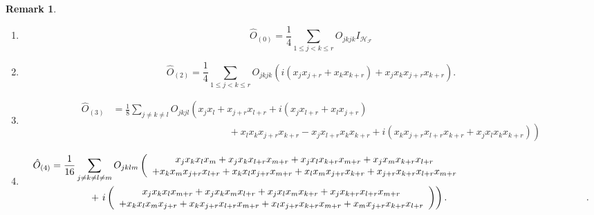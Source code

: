 \documentclass[aps,preprint]{revtex4}%
\newtheorem{remark}[theorem]{Remark}
\begin{document}
\begin{remark}
\begin{enumerate}
\item
\begin{equation}
\hat{O}_{\left(  0\right)  }=\frac{1}{4}\sum_{1\leq j<k\leq r}O_{jkjk}%
I_{\mathcal{H}_{\mathcal{F}}}%
\end{equation}


\item
\begin{equation}
\hat{O}_{\left(  2\right)  }=\frac{1}{4}\sum_{1\leq j<k\leq r}O_{jkjk}\left(
\overset{}{i\left(  x_{j}x_{j+r}+x_{k}x_{k+r}\right)  +x_{j}x_{k}%
x_{j+r}x_{k+r}}\right)  .
\end{equation}


\item
\begin{align}
\hat{O}_{\left(  3\right)  }  &  =\frac{1}{8}\sum_{j\neq k\neq l}%
O_{jkjl}\left(  \overset{}{x_{j}x_{l}+x_{j+r}x_{l+r}+i\left(  x_{j}%
x_{l+r}+x_{l}x_{j+r}\right)  }\right. \\
&  \hspace{2in}+\left.  \overset{}{x_{l}x_{k}x_{j+r}x_{k+r}-x_{j}x_{l+r}%
x_{k}x_{k+r}+i\left(  x_{k}x_{j+r}x_{l+r}x_{k+r}+x_{j}x_{l}x_{k}%
x_{k+r}\right)  }\right)
\end{align}


\item
\begin{align}
\hat{O}_{\left(  4\right)  }  &  =\frac{1}{16}\sum_{j\neq k\neq l\neq
m}O_{jklm}\left(
\begin{array}
[c]{c}%
\overset{}{x_{j}x_{k}x_{l}x_{m}+x_{j}x_{k}x_{l+r}x_{m+r}+x_{j}x_{l}%
x_{k+r}x_{m+r}+x_{j}x_{m}x_{k+r}x_{l+r}}\\
+\overset{}{x_{k}x_{m}x_{j+r}x_{l+r}+x_{k}x_{l}x_{j+r}x_{m+r}+x_{l}%
x_{m}x_{j+r}x_{k+r}+x_{j+r}x_{k+r}x_{l+r}x_{m+r}}%
\end{array}
\right. \\
&  \qquad\quad\quad+\left.  i\left(
\begin{array}
[c]{c}%
\overset{}{x_{j}x_{k}x_{l}x_{m+r}+x_{j}x_{k}x_{m}x_{l+r}+x_{j}x_{l}%
x_{m}x_{k+r}+x_{j}x_{k+r}x_{l+r}x_{m+r}}\\
+\overset{}{x_{k}x_{l}x_{m}x_{j+r}+x_{k}x_{j+r}x_{l+r}x_{m+r}+x_{l}%
x_{j+r}x_{k+r}x_{m+r}+x_{m}x_{j+r}x_{k+r}x_{l+r}}%
\end{array}
\right)  \right)  .\hspace{2in}.
\end{align}

\end{enumerate}
\end{remark}
\end{document}
